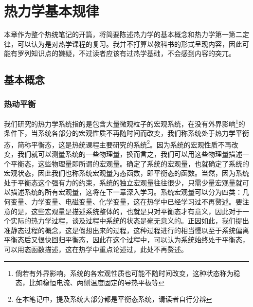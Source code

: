 \documentclass[../../main.tex]{subfiles}
\begin{document}
\chapter{热力学基本规律}
本章作为整个热统笔记的开篇，将简要陈述热力学的基本概念和热力学第一第二定律，可以认为是对热学课程的复习。我并不打算以教科书的形式呈现内容，因此可能有罗列知识点的嫌疑，不过读者应该有过热学基础，不会感到内容的突兀。
\section{基本概念}
\subsection{热动平衡}
我们研究的热力学系统指的是包含大量微观粒子的宏观系统，在没有外界影响\footnote{倘若有外界影响，系统的各宏观性质也可能不随时间改变，这种状态称为稳态，比如稳恒电流、两侧温度固定的导热平板等}的条件下，当系统各部分的宏观性质不再随时间而改变，我们称系统处于热力学平衡态，简称平衡态，这是热统课程主要研究的系统\footnote{在本笔记中，提及系统大部分都是平衡态系统，请读者自行分辨}。因为系统的宏观性质不再改变，我们就可以测量系统的一些物理量，换而言之，我们可以用这些物理量描述一个平衡态，这些物理量即所谓的宏观量。确定了系统的宏观量，也就确定了系统的宏观状态，因此我们也称系统宏观量为态函数，即平衡态的函数。当然，因为系统处于平衡态这个强有力的约束，系统的独立宏观量往往很少，只需少量宏观量就可以描述系统的所有宏观量，这将在下一章深入学习。系统宏观量可以分为四类：几何变量、力学变量、电磁变量、化学变量，这在热学中已经学习过不再赘述。要注意的是，这些宏观量是描述系统整体的，也就是只对平衡态才有意义，因此对于一个实际的热力学过程，谈及过程中系统的状态是毫无意义的。正因如此，我们提出准静态过程的概念，这是假想出来的过程，这种过程进行的相当慢以至于系统偏离平衡态后又很快回归平衡态，因此在这个过程中，可以认为系统始终处于平衡态，可以用态函数描述，这在热学中重点论述过，此处不再赘述。
\end{document}
